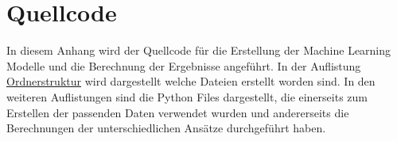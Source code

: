 




\chapter{Quellcode}

In diesem Anhang wird der Quellcode für die Erstellung der Machine Learning Modelle und die 
Berechnung der Ergebnisse angeführt. In der Auflistung \hyperref[ordnerstruktur]{Ordnerstruktur} wird dargestellt welche Dateien 
erstellt worden sind. In den weiteren Auflistungen sind die Python Files dargestellt, die einerseits zum Erstellen der passenden 
Daten verwendet wurden und andererseits die Berechnungen der unterschiedlichen Ansätze durchgeführt haben.

\label{sec:quellcode}


